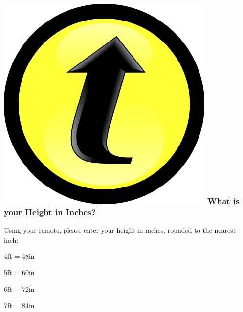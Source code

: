 \documentclass[handout]{beamer}
\begin{document}


\begin{frame}

\frametitle{\includegraphics[scale = 0.05]{./images/clicker} \hfill  What is your Height in Inches?}

Using your remote, please enter your height in inches, rounded to the nearest inch:

\vspace{1em}
	4ft = 48in
	
	5ft = 60in 
	
	6ft = 72in
	
	7ft = 84in


\end{frame}


\end{document}
